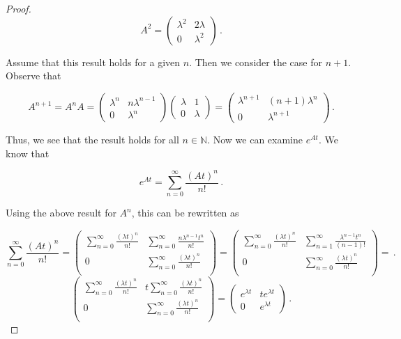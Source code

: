 \documentclass[a4paper]{article}
\numberwithin{equation}{section}
\begin{document}
\begin{description}
\begin{proof}
$$A^2 = \begin{pmatrix}
\lambda^2 & 2\lambda^{} \\
0 & \lambda^2
\end{pmatrix}\,.$$

Assume that this result holds for a given $n$. Then we consider the case for $n+1$. Observe that

$$A^{n+1} = A^nA =  \begin{pmatrix}
\lambda^n & n\lambda^{n-1} \\
0 & \lambda^n
\end{pmatrix}\begin{pmatrix}
\lambda & 1 \\
0 & \lambda
\end{pmatrix} = \begin{pmatrix}
\lambda^{n+1} & (n+1)\lambda^{n} \\
0 & \lambda^{n+1}
\end{pmatrix}\,.$$

Thus, we see that the result holds for all $n \in \mathbb{N}$. Now we can examine $e^{At}$. We know that 

$$e^{At} = \sum_{n=0}^{\infty} \frac{(At)^n}{n!}\,.$$

Using the above result for $A^n$, this can be rewritten as

$$\sum_{n=0}^{\infty} \frac{(At)^n}{n!} = \begin{pmatrix}
\sum_{n=0}^{\infty} \frac{(\lambda t)^n}{n!} & \sum_{n=0}^{\infty} \frac{n\lambda^{n-1} t^n}{n!} \\
0 & \sum_{n=0}^{\infty} \frac{(\lambda t)^n}{n!} \\
\end{pmatrix} = 
\begin{pmatrix}
\sum_{n=0}^{\infty} \frac{(\lambda t)^n}{n!} & \sum_{n=1}^{\infty} \frac{\lambda^{n-1} t^n}{(n-1)!} \\
0 & \sum_{n=0}^{\infty} \frac{(\lambda t)^n}{n!} \\
\end{pmatrix} = \,.$$
$$\begin{pmatrix}
\sum_{n=0}^{\infty} \frac{(\lambda t)^n}{n!} &  t\sum_{n=0}^{\infty} \frac{(\lambda t)^n}{n!} \\
0 & \sum_{n=0}^{\infty} \frac{(\lambda t)^n}{n!} \\
\end{pmatrix} = \begin{pmatrix}
e^{{\lambda}t} & te^{{\lambda}t} \\
0 & {e^{\lambda t}}
\end{pmatrix}\,.$$


\end{proof}
\end{description}
\end{document}
